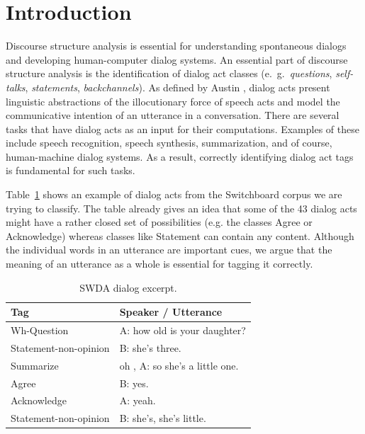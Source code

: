 \section{Introduction}\label{sec:intro}
Discourse structure analysis is essential for understanding spontaneous dialogs and developing human-computer dialog systems.
An essential part of discourse structure analysis is the identification of dialog act classes (e.\ g.\ \emph{questions}, \emph{self-talks}, \emph{statements}, \emph{backchannels}).
As defined by Austin , dialog acts present linguistic abstractions of the illocutionary force of speech acts and model the communicative intention of an utterance in a conversation. There are several tasks that have dialog acts as an input for their computations. Examples of these include speech recognition, speech synthesis, summarization, and of course, human-machine dialog systems. As a result, correctly identifying dialog act tags is fundamental for such tasks.


Table~\ref{tab:swda_example} shows an example of dialog acts from the Switchboard corpus we are trying to classify. The table already gives an idea that some of the 43 dialog acts might have a rather closed set of possibilities (e.g. the classes Agree or Acknowledge) whereas classes like Statement can contain any content. Although the individual words in an utterance are important cues, we argue that the meaning of an utterance as a whole is essential for tagging it correctly.



\begin{table}[h]
\centering
\small
\begin{tabular}{ll}
\hline
\textbf{Tag} & \textbf{Speaker / Utterance}
\\
\hline
Wh-Question & A: how old is your daughter?\\
Statement-non-opinion & B: she's three.\\
Summarize & oh , A: so she's a little one.\\
Agree & B: yes.\\
Acknowledge & A: yeah.\\
Statement-non-opinion & B: she's, she's little.\\
\hline
\end{tabular}
\caption{SWDA dialog excerpt.}
\label{tab:swda_example}
\end{table}

